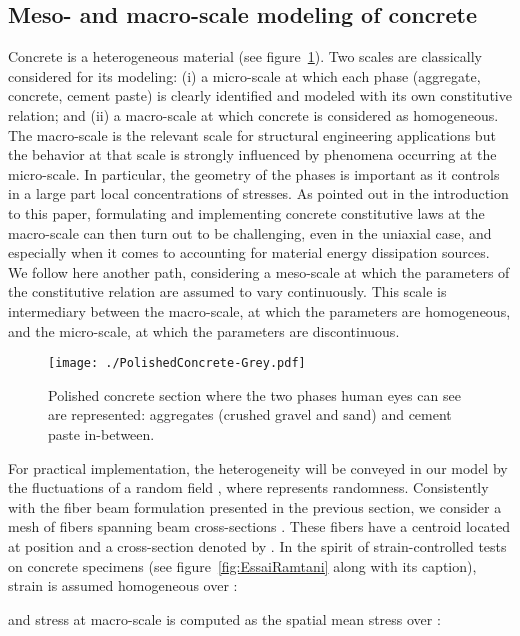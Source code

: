\documentclass[12p]{amsart}
\begin{document}
\subsection{Meso- and macro-scale modeling of concrete}
Concrete is a heterogeneous material (see figure~\ref{fig:phases}). Two scales are classically considered for its modeling: (i) a micro-scale at which each phase (aggregate, concrete, cement paste) is clearly identified and modeled with its own constitutive relation; and (ii) a macro-scale at which concrete is considered as homogeneous. The macro-scale is the relevant scale for structural engineering applications but the behavior at that scale is strongly influenced by phenomena occurring at the micro-scale. In particular, the geometry of the phases is important as it controls in a large part local concentrations of stresses. As pointed out in the introduction to this paper, formulating and implementing concrete constitutive laws at the macro-scale can then turn out to be challenging, even in the uniaxial case, and especially when it comes to accounting for material energy dissipation sources. We follow here another path, considering a meso-scale at which the parameters of the constitutive relation are assumed to vary continuously. This scale is intermediary between the macro-scale, at which the parameters are homogeneous, and the micro-scale, at which the parameters are discontinuous.
\begin{figure}[htb]
\begin{center}
 \texttt{[image: ./PolishedConcrete-Grey.pdf]}
\caption{Polished concrete section where the two phases human eyes can see are represented: aggregates (crushed gravel and sand) and cement paste in-between.} 
\label{fig:phases}
\end{center}
\end{figure}

For practical implementation, the heterogeneity will be conveyed in our model by the fluctuations of a random field , where  represents randomness. Consistently with the fiber beam formulation presented in the previous section, we consider a mesh of fibers  spanning beam cross-sections . These fibers have a centroid located at position  and a cross-section denoted by . In the spirit of strain-controlled tests on concrete specimens (see figure~\ref{fig:EssaiRamtani} along with its caption), strain  is assumed homogeneous over :

and stress at macro-scale  is computed as the spatial mean stress over :
\end{document}
